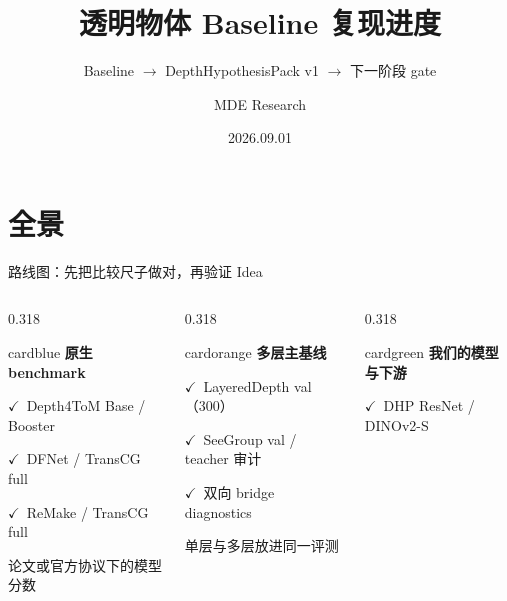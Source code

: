\documentclass{beamer}
\title{透明物体 Baseline 复现进度}
\subtitle{Baseline $\rightarrow$ DepthHypothesisPack v1 $\rightarrow$ 下一阶段 gate}
\author{MDE Research}
\date{2026.09.01}
\newcommand{\ok}{\textcolor{good}{\ensuremath{\checkmark}}}
\newcommand{\cardtitle}[1]{\textcolor{maincolor}{\bfseries #1}}
\begin{document}
\maketitle

\section{全景}

\begin{frame}{路线图：先把比较尺子做对，再验证 Idea}
\vspace{-0.35em}
\begin{columns}[T,onlytextwidth]
  \begin{column}{0.318\textwidth}
    \begin{beamercolorbox}[wd=\linewidth,sep=0.85em,rounded=true]{cardblue}
      \cardtitle{原生 benchmark}

      \vspace{0.45em}\small
      \ok\ Depth4ToM Base / Booster

      \ok\ DFNet / TransCG full

      \ok\ ReMake / TransCG full

      \vspace{0.6em}\scriptsize
      论文或官方协议下的模型分数
    \end{beamercolorbox}
  \end{column}
  \begin{column}{0.318\textwidth}
    \begin{beamercolorbox}[wd=\linewidth,sep=0.85em,rounded=true]{cardorange}
      \cardtitle{多层主基线}

      \vspace{0.45em}\small
      \ok\ LayeredDepth val（300）

      \ok\ SeeGroup val / teacher 审计

      \ok\ 双向 bridge diagnostics

      \vspace{0.6em}\scriptsize
      单层与多层放进同一评测
    \end{beamercolorbox}
  \end{column}
  \begin{column}{0.318\textwidth}
    \begin{beamercolorbox}[wd=\linewidth,sep=0.85em,rounded=true]{cardgreen}
      \cardtitle{我们的模型与下游}

      \vspace{0.45em}\small
      \ok\ DHP ResNet / DINOv2-S


\end{beamercolorbox}
\end{column}
\end{columns}
\end{frame}
\end{document}
